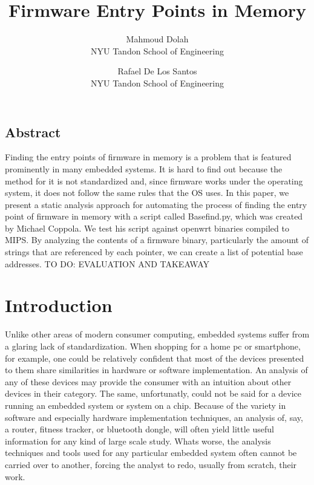 \documentclass[letterpaper,twocolumn,10pt]{article}
\begin{document}
\title{\Large \bf Firmware Entry Points in Memory}
\author{
    {\rm Mahmoud Dolah}\\
    NYU Tandon School of Engineering
    \and
    {\rm Rafael De Los Santos}\\
    NYU Tandon School of Engineering
}

\date{}

\maketitle

\thispagestyle{empty}

\subsection*{Abstract}
Finding the entry points of firmware in memory is a problem that is featured prominently in many embedded systems. It is hard to find out because the method for it is not standardized and, since firmware works under the operating system, it does not follow the same rules that the OS uses. In this paper, we present a static analysis approach for automating the process of finding the entry point of firmware in memory with a script called Basefind.py, which was created by Michael Coppola. We test his script against openwrt binaries compiled to MIPS. By analyzing the contents of a firmware binary, particularly the amount of strings that are referenced by each pointer, we can create a list of potential base addresses.  
TO DO: EVALUATION AND TAKEAWAY

\section{Introduction}
Unlike other areas of modern consumer computing, embedded systems suffer from a glaring lack of standardization. When shopping for a home pc or smartphone, for example, one could be relatively confident that most of the devices presented to them share similarities in hardware or software implementation. An analysis of any of these devices may provide the consumer with an intuition about other devices in their category. The same, unfortunatly, could not be said for a device running an embedded system or system on a chip. Because of the variety in software and especially hardware implementation techniques, an analysis of, say, a router, fitness tracker, or bluetooth dongle, will often yield little useful information for any kind of large scale study. Whats worse, the analysis techniques and tools used for any particular embedded system often cannot be carried over to another, forcing the analyst to redo, usually from scratch, their work.
\end{document}
